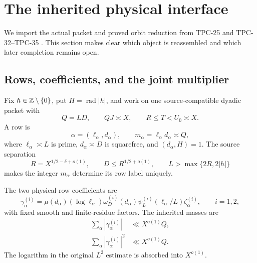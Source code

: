 \section{The inherited physical interface}
\label{sec:tpc36-physical-interface}

We import the actual packet and proved orbit reduction from TPC-25 and
TPC-32--TPC-35 \citep{WangTPC25,WangTPC32,WangTPC33,WangTPC34,WangTPC35}.
This section makes clear which object is reassembled and which later
completion remains open.

\subsection{Rows, coefficients, and the joint multiplier}

Fix \(h\in\mathbb Z\setminus\{0\}\), put \(H=\operatorname{rad}|h|\), and work
on one source-compatible dyadic packet with
\begin{equation}
 Q=LD,\qquad QJ\asymp X,\qquad R\le T<U_0\asymp X.
 \label{eq:tpc36-physical-scales}
\end{equation}
A row is
\begin{equation}
 \alpha=(\ell_\alpha,d_\alpha),\qquad
 m_\alpha=\ell_\alpha d_\alpha\asymp Q,
 \label{eq:tpc36-row}
\end{equation}
where \(\ell_\alpha\asymp L\) is prime, \(d_\alpha\asymp D\) is
squarefree, and \((d_\alpha,H)=1\).  The source separation
\begin{equation}
 R=X^{1/2-\delta+o(1)},\qquad
 D\le R^{1/2+o(1)},\qquad
 L>\max\{2R,2|h|\}
 \label{eq:tpc36-source-separation}
\end{equation}
makes the integer \(m_\alpha\) determine its row label uniquely.

The two physical row coefficients are
\begin{equation}
 \gamma_\alpha^{(i)}
 =\mu(d_\alpha)(\log\ell_\alpha)
  \omega_D^{(i)}(d_\alpha)
  \psi_L^{(i)}(\ell_\alpha/L)\zeta_\alpha^{(i)},
 \qquad i=1,2,
 \label{eq:tpc36-row-coefficients}
\end{equation}
with fixed smooth and finite-residue factors.  The inherited masses are
\begin{align}
 \sum_\alpha|\gamma_\alpha^{(i)}|
 &\ll X^{o(1)}Q,
 \label{eq:tpc36-row-l1}\\
 \sum_\alpha|\gamma_\alpha^{(i)}|^2
 &\ll X^{o(1)}Q.
 \label{eq:tpc36-row-l2}
\end{align}
The logarithm in the original \(L^2\) estimate is absorbed into
\(X^{o(1)}\).

